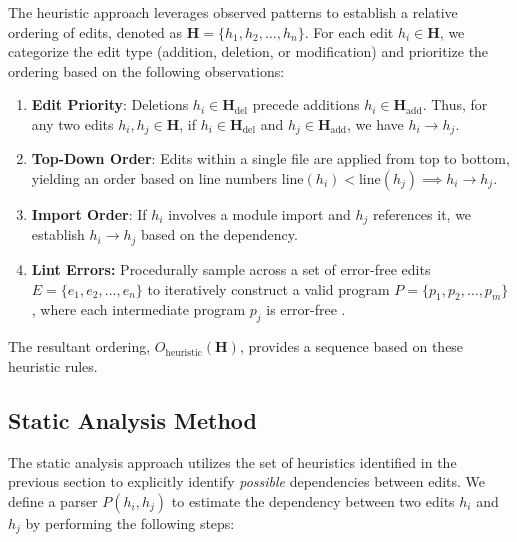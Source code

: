 The heuristic approach leverages observed patterns to establish a relative ordering of edits, denoted as \(\mathbf{H} = \{ h_1, h_2, \dots, h_n \}\). For each edit \( h_i \in \mathbf{H} \), we categorize the edit type (addition, deletion, or modification) and prioritize the ordering based on the following observations:

\begin{enumerate}
\item \textbf{Edit Priority}: Deletions \( h_i \in \mathbf{H}_{\text{del}} \) precede additions \( h_i \in \mathbf{H}_{\text{add}} \). Thus, for any two edits \( h_i, h_j \in \mathbf{H} \), if \( h_i \in \mathbf{H}_{\text{del}} \) and \( h_j \in \mathbf{H}_{\text{add}} \), we have \( h_i \rightarrow h_j \).
\item \textbf{Top-Down Order}: Edits within a single file are applied from top to bottom, yielding an order based on line numbers \( \text{line}(h_i) < \text{line}(h_j) \implies h_i \rightarrow h_j \).
\item \textbf{Import Order}: If \( h_i \) involves a module import and \( h_j \) references it, we establish \( h_i \rightarrow h_j \) based on the dependency.
\item \textbf{Lint Errors:} Procedurally sample across a set of error-free edits \( E = \{e_1, e_2, \dots, e_n\} \) to iteratively construct a valid program \( P = \{p_1, p_2, \dots, p_m\} \), where each intermediate program \( p_j \) is error-free \cite{jimenez2023, pandey2024}.
\end{enumerate}


The resultant ordering, \( O_{\text{heuristic}}(\mathbf{H}) \), provides a sequence based on these heuristic rules. 

\subsection{Static Analysis Method}

The static analysis approach utilizes the set of heuristics identified in the previous section to explicitly identify \textit{possible} dependencies between edits. We define a parser \( P(h_i, h_j) \) to estimate the dependency between two edits \( h_i \) and \( h_j \) by performing the following steps:

